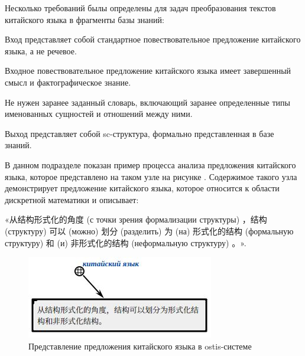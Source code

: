 Несколько требований былы определены для задач преобразования текстов китайского языка в фрагменты базы знаний:
\begin{textitemize}
	\item Вход представляет собой стандартное повествовательное предложение китайского языка, а не речевое.
	\item Входное повествовательное предложение китайского языка имеет завершенный смысл и фактографическое знание.
	\item Не нужен заранее заданный словарь, включающий заранее определенные типы именованных сущностей и отношений между ними.
	\item Выход представляет собой sc-структура, формально представленная в базе знаний.
\end{textitemize}

В данном подразделе показан пример процесса анализа предложения китайского языка, которое представлено на таком узле на рисунке \textit{}. Содержимое такого узла демонстрирует предложение китайского языка, которое относится к области дискретной математики и описывает: \begin{CJK}{UTF8}{gbsn}«从结构形式化的角度 (с точки зрения формализации структуры) ，结构(структуру) 可以 (можно) 划分 (разделить) 为 (на) 形式化的结构 (формальную структуру) 和 (и) 非形式化的结构 (неформальную структуру) 。». \end{CJK}
\begin{figure}[H]
	\centering
	\includegraphics[scale=0.8]{images/part4/chapter_chinese/chinese_sentence.png}
	\caption{Представление предложения китайского языка в ostis-системе}
	\label{fig:chinese-sentence-sc}
\end{figure}

